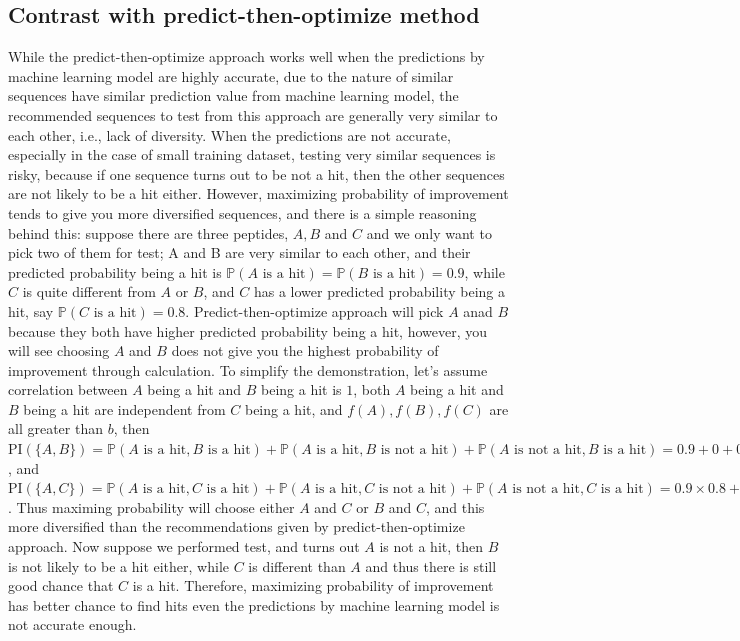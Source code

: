 \documentclass[11pt]{article}
\newcommand{\Prob}{\mathbb{P}}
\newcommand{\PI}{\text{PI}}
\begin{document}
\subsection{Contrast with predict-then-optimize method} \label{sec:contrast with predict-then-optimize}
While the predict-then-optimize approach works well when the predictions by machine learning model are highly accurate, due to the nature of similar sequences have similar prediction value from machine learning model, the recommended sequences to test from this approach are generally very similar to each other, i.e., lack of diversity. When the predictions are not accurate, especially in the case of small training dataset, testing very similar sequences is risky, because if one sequence
turns out to be not a hit, then the other sequences are not likely to be a hit either. However, maximizing probability of improvement tends to give you more diversified sequences, and there is a simple reasoning behind this: suppose there are three peptides, $A, B$ and $C$ and we only want to pick two of them for test; A and B are very similar to each other, and their predicted probability being a hit is $\Prob (A \text{ is a hit}) = \Prob (B \text{ is a hit}) = 0.9$, while $C$ is
quite different from $A$ or $B$, and $C$ has a lower predicted probability being a hit,
say $\Prob (C \text{ is a hit}) = 0.8$. Predict-then-optimize approach will pick $A$ anad $B$ because they both have higher predicted probability being a hit, however, you will see choosing $A$ and $B$ does not give you the highest probability of improvement through calculation. To simplify the demonstration, let's assume correlation between $A$ being a hit and $B$ being a hit is $1$, both $A$ being a hit and $B$ being a hit are independent from $C$ being a hit, and $f(A), f(B), f(C)$ are all greater than
$b$, then $\PI (\{A, B\}) = \Prob (A \text{ is a hit}, B \text{ is a hit}) + \Prob (A \text{ is a hit}, B \text{ is not a hit}) + \Prob (A \text{ is not a hit}, B \text{ is a hit}) = 0.9 + 0 + 0 = 0.9$, and $\PI (\{A, C\}) = \Prob (A \text{ is a hit}, C \text{ is a hit}) + \Prob (A \text{ is a hit}, C \text{ is not a hit}) + \Prob (A \text{ is not a hit}, C \text{ is a hit}) = 0.9 \times 0.8 + 0.9 \times 0.2 + 0.1 \times 0.8 = 0.98$. Thus maximing probability will choose either $A$ and $C$ or $B$ and $C$, and this
more diversified than the recommendations given by predict-then-optimize approach. Now suppose we performed test, and turns out $A$ is not a hit, then $B$ is not likely to be a hit either, while $C$ is different than $A$ and thus there is still good chance that $C$ is a hit. Therefore, maximizing probability of improvement has better chance to find hits even the predictions by machine learning model is not accurate enough.
\end{document}
